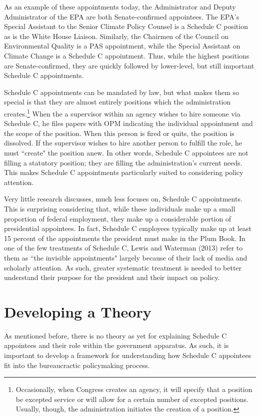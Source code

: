 \documentclass[12pt]{article}
\begin{document}
As an example of these appointments today, the Administrator and Deputy Administrator of the EPA are both Senate-confirmed appointees. The EPA's Special Assistant to the Senior Climate Policy Counsel is a Schedule C position as is the White House Liaison. Similarly, the Chairmen of the Council on Environmental Quality is a PAS appointment, while the Special Assistant on Climate Change is a Schedule C appointment. Thus, while the highest positions are Senate-confirmed, they are quickly followed by lower-level, but still important Schedule C appointments. 

Schedule C appointments can be mandated by law, but what makes them so special is that they are almost entirely positions which the administration creates.\footnote{Occasionally, when  Congress creates an agency, it will specify that a position be excepted service or will allow for a certain number of excepted positions. Usually, though, the administration initiates the creation of a position.} When the a supervisor within an agency wishes to hire someone via Schedule C, he files papers with OPM indicating the individual appointment and the scope of the position. When this person is fired or quits, the position is dissolved. If the supervisor wishes to hire another person to fulfill the role, he must ``create" the position anew. In other words, Schedule C appointees are not filling a statutory position; they are filling the administration's current needs. This makes Schedule C appointments particularly suited to considering policy attention.

Very little research discusses, much less focuses on, Schedule C appointments. This is surprising considering that, while these individuals make up a small proportion of federal employment, they make up a considerable portion of presidential appointees. In fact, Schedule C employees typically make up at least 15 percent of the appointments the president must make in the Plum Book. In one of the few treatments of Schedule C, Lewis and Waterman (2013) refer to them as ``the invisible appointments" largely because of their lack of media and scholarly attention. As such, greater systematic treatment is needed to better understand their purpose for the president and their impact on policy. 

\section{Developing a Theory}

As mentioned before, there is no theory as yet for explaining Schedule C appointees and their role within the government apparatus. As such, it is important to develop a framework for understanding how Schedule C appointees fit into the bureaucractic policymaking process.
\end{document}
